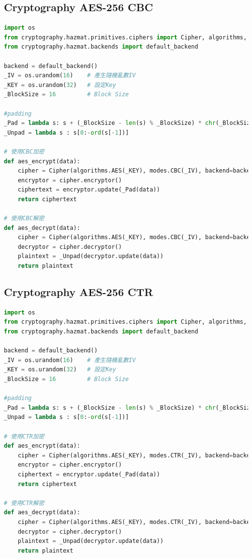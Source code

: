 \documentclass[12pt,a4paper]{article}
\begin{document}
\subsection{Cryptography AES-256 CBC}
{
\begin{lstlisting}[language=Python]
import os
from cryptography.hazmat.primitives.ciphers import Cipher, algorithms, modes
from cryptography.hazmat.backends import default_backend

backend = default_backend()
_IV = os.urandom(16)    # 產生隨機亂數IV
_KEY = os.urandom(32)	# 設定Key
_BlockSize = 16	        # Block Size

#padding
_Pad = lambda s: s + (_BlockSize - len(s) % _BlockSize) * chr(_BlockSize - len(s) % _BlockSize)
_Unpad = lambda s : s[0:-ord(s[-1])]

# 使用CBC加密
def aes_encrypt(data):
    cipher = Cipher(algorithms.AES(_KEY), modes.CBC(_IV), backend=backend)
    encryptor = cipher.encryptor()
    ciphertext = encryptor.update(_Pad(data))
    return ciphertext

# 使用CBC解密
def aes_decrypt(data):
    cipher = Cipher(algorithms.AES(_KEY), modes.CBC(_IV), backend=backend)
    decryptor = cipher.decryptor()
    plaintext = _Unpad(decryptor.update(data))
    return plaintext
\end{lstlisting}
}

\subsection{Cryptography AES-256 CTR}
{
\begin{lstlisting}[language=Python]
import os
from cryptography.hazmat.primitives.ciphers import Cipher, algorithms, modes
from cryptography.hazmat.backends import default_backend

backend = default_backend()
_IV = os.urandom(16)    # 產生隨機亂數IV
_KEY = os.urandom(32)	# 設定Key
_BlockSize = 16	        # Block Size

#padding
_Pad = lambda s: s + (_BlockSize - len(s) % _BlockSize) * chr(_BlockSize - len(s) % _BlockSize)
_Unpad = lambda s : s[0:-ord(s[-1])]

# 使用CTR加密
def aes_encrypt(data):
    cipher = Cipher(algorithms.AES(_KEY), modes.CTR(_IV), backend=backend)
    encryptor = cipher.encryptor()
    ciphertext = encryptor.update(_Pad(data))
    return ciphertext

# 使用CTR解密
def aes_decrypt(data):
    cipher = Cipher(algorithms.AES(_KEY), modes.CTR(_IV), backend=backend)
    decryptor = cipher.decryptor()
    plaintext = _Unpad(decryptor.update(data))
    return plaintext
\end{lstlisting}
}
\end{document}
